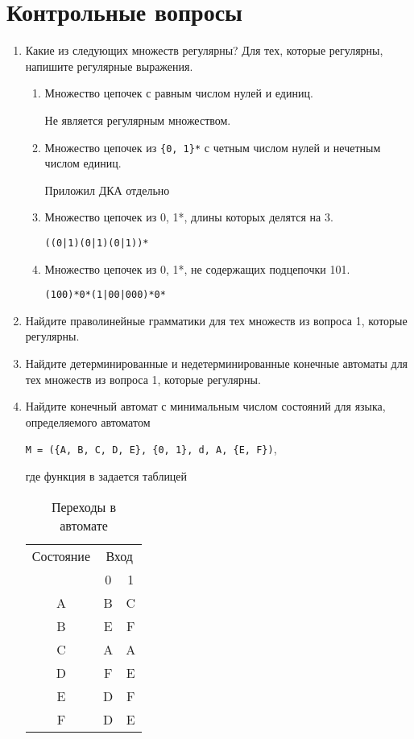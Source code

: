 \section{Контрольные вопросы}

\begin{enumerate}
\item Какие из следующих множеств регулярны? Для тех, которые регулярны, напишите регулярные выражения.
    \begin{enumerate}
    \item Множество цепочек с равным числом нулей и единиц.
    
    Не является регулярным множеством.
    \item Множество цепочек из \texttt{\{0, 1\}*} с четным числом нулей и нечетным числом единиц.
    
    Приложил ДКА отдельно
    \item Множество цепочек из {0, 1}*, длины которых делятся на 3.
    
    \texttt{((0|1)(0|1)(0|1))*}
    \item Множество цепочек из {0, 1}*, не содержащих подцепочки 101.

    \texttt{(100)*0*(1|00|000)*0*}
    \end{enumerate}
\item Найдите праволинейные грамматики для тех множеств из вопроса 1, которые регулярны.
\item Найдите детерминированные и недетерминированные конечные автоматы для тех множеств из вопроса 1,
которые регулярны.
\item Найдите конечный автомат с минимальным числом состояний для языка, определяемого автоматом

\texttt{M = (\{A, B, C, D, E\}, \{0, 1\}, d, A, \{E, F\})},

где функция в задается таблицей

\begin{table}[h]
    \centering
    \small
    \caption{Переходы в автомате}
    \label{tbl:cmp}

    \begin{tabular}{|c|c|c|}
        \hline
        Состояние & \multicolumn{2}{c|}{Вход} \\ \cline{2-3}
        & 0 & 1 \\\hline
        A & B & C\\
        B & E & F\\
        C & A & A\\
        D & F & E\\
        E & D & F\\
        F & D & E\\\hline
    \end{tabular}
\end{table}

\end{enumerate}
